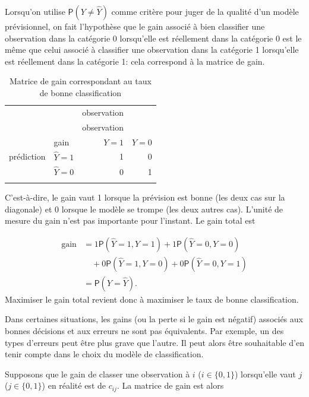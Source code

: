 \documentclass[
  11pt,
  letterpaper,
]{book}
\theoremstyle{definition}
\theoremstyle{definition}
\theoremstyle{definition}
\theoremstyle{remark}
\begin{document}
Lorsqu'on utilise \({\mathsf P}\left(Y \neq \widehat{Y}\right)\) comme critère pour juger de la qualité d'un modèle prévisionnel, on fait l'hypothèse que le gain associé à bien classifier une observation dans la catégorie 0 lorsqu'elle est réellement dans la catégorie 0 est le même que celui associé à classifier une observation dans la catégorie 1 lorsqu'elle est réellement dans la catégorie 1: cela correspond à la matrice de gain.

\begin{longtable}[]{@{}llrr@{}}
\caption{\label{tab:03-gain1} Matrice de gain correspondant au taux de bonne classification}\tabularnewline
\toprule
& & observation & \\ \addlinespace
\midrule
\endfirsthead
\toprule
& & observation & \\ \addlinespace
\midrule
\endhead
& gain & \(Y=1\) & \(Y=0\) \\ \addlinespace
prédiction & \(\widehat{Y}=1\) & 1 & 0 \\ \addlinespace
& \(\widehat{Y}=0\) & 0 & 1 \\ \addlinespace
\bottomrule
\end{longtable}

C'est-à-dire, le gain vaut 1 lorsque la prévision est bonne (les deux cas sur la diagonale) et 0 lorsque le modèle se trompe (les deux autres cas). L'unité de mesure du gain n'est pas importante pour l'instant. Le gain total est

\begin{align*}
\text{gain} &= 1 {\mathsf P}\left(\widehat{Y}=1, Y=1\right) + 1 {\mathsf P}\left(\widehat{Y}=0, Y=0\right) 
\\ &\quad + 0 {\mathsf P}\left(\widehat{Y}=1, Y=0\right)  + 0 {\mathsf P}\left(\widehat{Y}=0, Y=1\right)
\\& = {\mathsf P}\left(Y = \widehat{Y}\right).
\end{align*}
Maximiser le gain total revient donc à maximiser le taux de bonne classification.

Dans certaines situations, les gains (ou la perte si le gain est négatif) associés aux bonnes décisions et aux erreurs ne sont pas équivalents. Par exemple, un des types d'erreurs peut être plus grave que l'autre. Il peut alors être souhaitable d'en tenir compte dans le choix du modèle de classification.

Supposons que le gain de classer une observation à \(i\) (\(i \in \{0,1\}\)) lorsqu'elle vaut \(j\) (\(j \in \{0,1\}\)) en réalité est de \(c_{ij}\). La matrice de gain est alors
\end{document}
